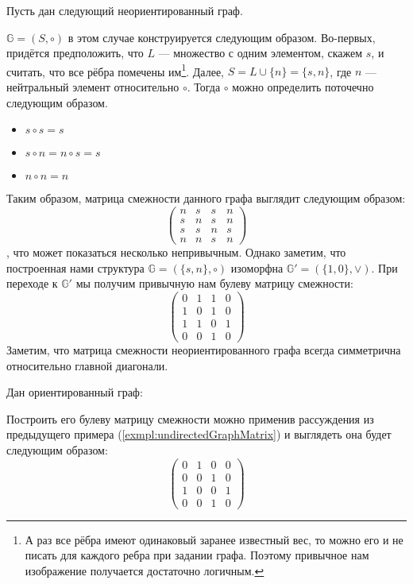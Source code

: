\begin{example}\label{exmpl:undirectedGraphMatrix}
  Пусть дан следующий неориентированный граф.
  \begin{center}
    
  \end{center}

$\mathbb{G} = (S,\circ)$ в этом случае конструируется следующим образом. Во-первых, придётся предположить, что $L$ --- множество с одним элементом, скажем $s$, и считать, что все рёбра помечены им\footnote{А раз все рёбра имеют одинаковый заранее известный вес, то можно его и не писать для каждого ребра при задании графа. Поэтому привычное нам изображение получается достаточно логичным.}. Далее, $S = L \cup{\{n\}} = \{s,n\}$, где $n$ --- нейтральный элемент относительно $\circ$. Тогда $\circ$ можно определить поточечно следующим образом.
\begin{itemize}
  \item $s \circ s = s$
  \item $s \circ n = n \circ s = s$
  \item $n \circ n = n$
\end{itemize} 

Таким образом, матрица смежности данного графа выглядит следующим образом:
$$
\begin{pmatrix}
  n & s & s & n \\
  s & n & s & n \\
  s & s & n & s \\
  n & n & s & n
\end{pmatrix}
$$
, что может показаться несколько непривычным. Однако заметим, что построенная нами структура $\mathbb{G} = (\{s,n\}, \circ)$ изоморфна $\mathbb{G}' = (\{1,0\}, \vee)$. При переходе к $\mathbb{G}'$ мы получим привычную нам булеву матрицу смежности: 
  $$
  \begin{pmatrix}
    0 & 1 & 1 & 0 \\
    1 & 0 & 1 & 0 \\
    1 & 1 & 0 & 1 \\
    0 & 0 & 1 & 0
  \end{pmatrix}
  $$
  Заметим, что матрица смежности неориентированного графа всегда симметрична относительно главной диагонали.
\end{example}

\begin{example}\label{example:diGraph}
  Дан ориентированный граф:
  \begin{center}
  
  \end{center}

  Построить его булеву матрицу смежности можно применив рассуждения из предыдущего примера (\ref{exmpl:undirectedGraphMatrix}) и выглядеть она будет следующим образом:
  $$
  \begin{pmatrix}
    0 & 1 & 0 & 0 \\
    0 & 0 & 1 & 0 \\
    1 & 0 & 0 & 1 \\
    0 & 0 & 1 & 0
  \end{pmatrix}
  $$
\end{example}

